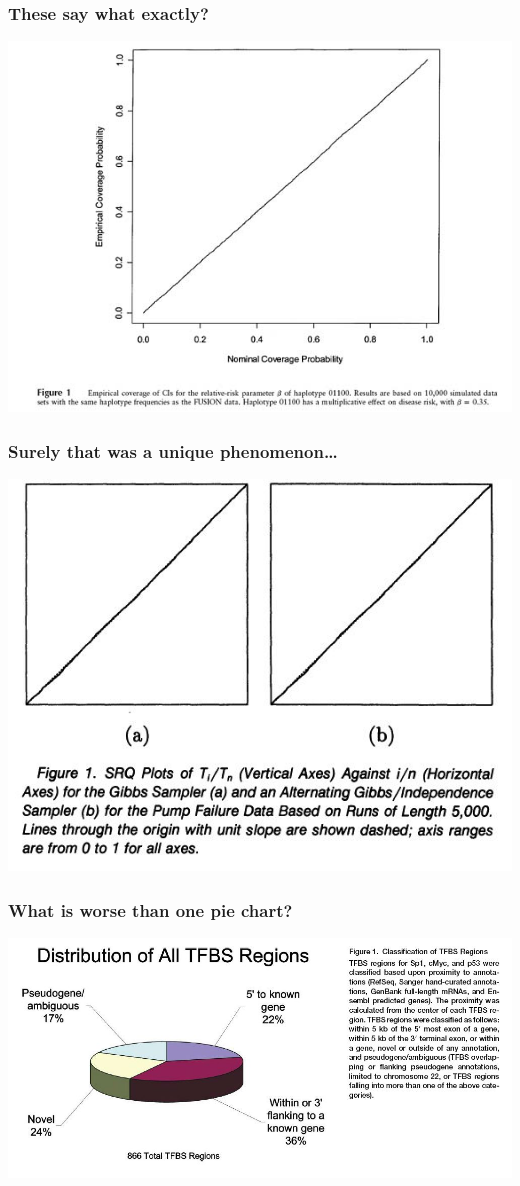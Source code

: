 \documentclass{beamer}
\begin{document}
\begin{frame}
  \frametitle{These say what exactly?}
  \includegraphics[width = \textwidth, keepaspectratio = true]{figure/epstein_fig1}
\end{frame}

\begin{frame}
  \frametitle{Surely that was a unique phenomenon\ldots}
  \includegraphics[width = \textwidth, keepaspectratio = true]{figure/mykland_fig1}
\end{frame}

\begin{frame}
  \frametitle{What is worse than one pie chart?}
  \includegraphics[width = \textwidth, keepaspectratio = true]{figure/cawley_fig1}
\end{frame}
\end{document}
